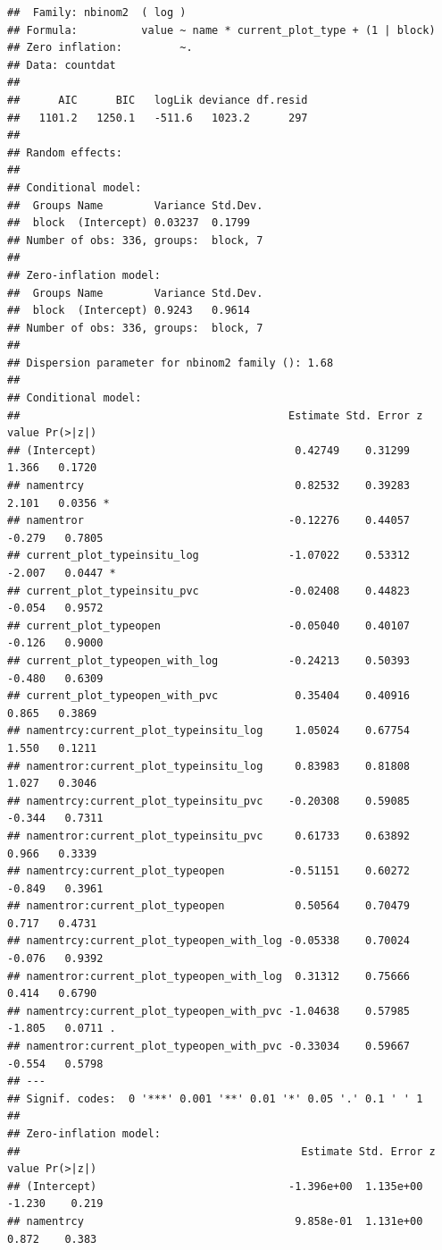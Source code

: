 \documentclass[
]{article}
\begin{document}
\begin{verbatim}
##  Family: nbinom2  ( log )
## Formula:          value ~ name * current_plot_type + (1 | block)
## Zero inflation:         ~.
## Data: countdat
## 
##      AIC      BIC   logLik deviance df.resid 
##   1101.2   1250.1   -511.6   1023.2      297 
## 
## Random effects:
## 
## Conditional model:
##  Groups Name        Variance Std.Dev.
##  block  (Intercept) 0.03237  0.1799  
## Number of obs: 336, groups:  block, 7
## 
## Zero-inflation model:
##  Groups Name        Variance Std.Dev.
##  block  (Intercept) 0.9243   0.9614  
## Number of obs: 336, groups:  block, 7
## 
## Dispersion parameter for nbinom2 family (): 1.68 
## 
## Conditional model:
##                                          Estimate Std. Error z value Pr(>|z|)  
## (Intercept)                               0.42749    0.31299   1.366   0.1720  
## namentrcy                                 0.82532    0.39283   2.101   0.0356 *
## namentror                                -0.12276    0.44057  -0.279   0.7805  
## current_plot_typeinsitu_log              -1.07022    0.53312  -2.007   0.0447 *
## current_plot_typeinsitu_pvc              -0.02408    0.44823  -0.054   0.9572  
## current_plot_typeopen                    -0.05040    0.40107  -0.126   0.9000  
## current_plot_typeopen_with_log           -0.24213    0.50393  -0.480   0.6309  
## current_plot_typeopen_with_pvc            0.35404    0.40916   0.865   0.3869  
## namentrcy:current_plot_typeinsitu_log     1.05024    0.67754   1.550   0.1211  
## namentror:current_plot_typeinsitu_log     0.83983    0.81808   1.027   0.3046  
## namentrcy:current_plot_typeinsitu_pvc    -0.20308    0.59085  -0.344   0.7311  
## namentror:current_plot_typeinsitu_pvc     0.61733    0.63892   0.966   0.3339  
## namentrcy:current_plot_typeopen          -0.51151    0.60272  -0.849   0.3961  
## namentror:current_plot_typeopen           0.50564    0.70479   0.717   0.4731  
## namentrcy:current_plot_typeopen_with_log -0.05338    0.70024  -0.076   0.9392  
## namentror:current_plot_typeopen_with_log  0.31312    0.75666   0.414   0.6790  
## namentrcy:current_plot_typeopen_with_pvc -1.04638    0.57985  -1.805   0.0711 .
## namentror:current_plot_typeopen_with_pvc -0.33034    0.59667  -0.554   0.5798  
## ---
## Signif. codes:  0 '***' 0.001 '**' 0.01 '*' 0.05 '.' 0.1 ' ' 1
## 
## Zero-inflation model:
##                                            Estimate Std. Error z value Pr(>|z|)
## (Intercept)                              -1.396e+00  1.135e+00  -1.230    0.219
## namentrcy                                 9.858e-01  1.131e+00   0.872    0.383

\end{verbatim}
\end{document}
